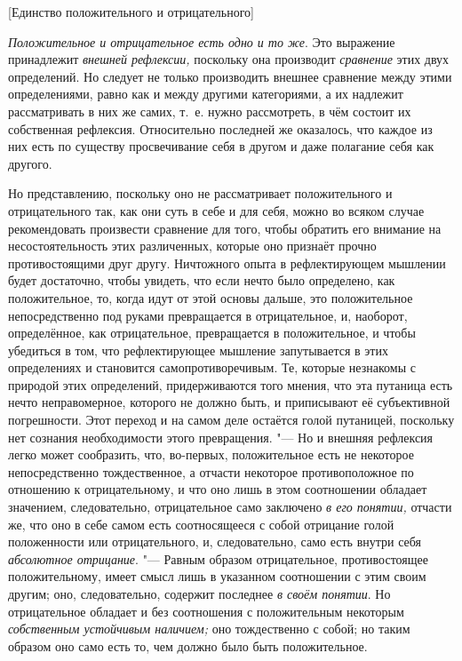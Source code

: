 %
  {[Единство положительного и отрицательного]}

{\em Положительное и отрицательное есть одно и то же}.
Это выражение принадлежит {\em внешней рефлексии,}
поскольку она производит {\em сравнение} этих двух
определений. Но следует не только производить внешнее сравнение между этими
определениями, равно как и между другими категориями, а их надлежит
рассматривать в них же самих, т.~е. нужно рассмотреть, в чём состоит их
собственная рефлексия. Относительно последней же оказалось, что каждое из
них есть по существу просвечивание себя в другом и даже полагание себя как
другого.

Но представлению, поскольку оно не рассматривает положительного и
отрицательного так, как они суть в себе и для себя, можно во всяком случае
рекомендовать произвести сравнение для того, чтобы обратить его внимание на
несостоятельность этих различенных, которые оно признаёт прочно
противостоящими друг другу. Ничтожного опыта в рефлектирующем мышлении
будет достаточно, чтобы увидеть, что если нечто было определено, как
положительное, то, когда идут от этой основы дальше, это положительное
непосредственно под руками превращается в отрицательное, и, наоборот,
определённое, как отрицательное, превращается в положительное, и чтобы
убедиться в том, что рефлектирующее мышление запутывается в этих
определениях и становится самопротиворечивым. Те, которые незнакомы с
природой этих определений, придерживаются того мнения, что эта путаница
есть нечто неправомерное, которого не должно быть, и приписывают её
субъективной погрешности. Этот переход и на самом деле остаётся голой
путаницей, поскольку нет сознания необходимости этого превращения. "--- Но и
внешняя рефлексия легко может сообразить, что, во-первых, положительное
есть не некоторое непосредственно тождественное, а отчасти некоторое
противоположное по отношению к отрицательному, и что оно лишь в этом
соотношении обладает значением, следовательно, отрицательное само заключено
{\em в его понятии,} отчасти
же, что оно в себе самом есть соотносящееся с собой отрицание голой
положенности или отрицательного, и, следовательно, само есть внутри себя
{\em абсолютное отрицание}. "--- Равным образом
отрицательное, противостоящее положительному, имеет смысл лишь в указанном
соотношении с этим своим другим; оно, следовательно, содержит последнее
{\em в своём понятии}. Но отрицательное обладает и без
соотношения с положительным некоторым {\em собственным
устойчивым наличием;} оно тождественно с собой; но таким образом оно само
есть то, чем должно было быть положительное.

